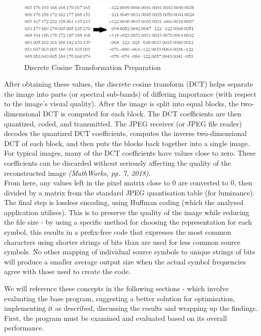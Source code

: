 \documentclass[12pt, a4paper]{article}
\begin{document}
\begin{figure}[H]
	\centering
		\includegraphics[width=0.8\textwidth]{"dcttransform"}
		\caption{Discrete Cosine Transformation Preparation}
\end{figure}

After obtaining these values, the discrete cosine transform (DCT) helps separate the image into parts (or spectral sub-bands) of differing importance (with respect to the image's visual quality). After the image is split into equal blocks, the two-dimensional DCT is computed for each block. The DCT coefficients are then quantized, coded, and transmitted. The JPEG receiver (or JPEG file reader) decodes the quantized DCT coefficients, computes the inverse two-dimensional DCT of each block, and then puts the blocks back together into a single image. For typical images, many of the DCT coefficients have values close to zero. These coefficients can be discarded without seriously affecting the quality of the reconstructed image \textit{(MathWorks, pp. 7, 2018)}. \\
From here, any values left in the pixel matrix close to 0 are converted to 0, then divided by a matrix from the standard JPEG quantisation table (for luminance). \\
The final step is lossless encoding, using Huffman coding (which the analysed application utilises). This is to preserve the quality of the image while reducing the file size - by using a specific method for choosing the representation for each symbol, this results in a prefix-free code that expresses the most common characters using shorter strings of bits than are used for less common source symbols. No other mapping of individual source symbols to unique strings of bits will produce a smaller average output size when the actual symbol frequencies agree with those used to create the code.

We will reference these concepts in the following sections - which involve evaluating the base program, suggesting a better solution for optimisation, implementing it as described, discussing the results and wrapping up the findings. First, the program must be examined and evaluated based on its overall performance.
\end{document}
